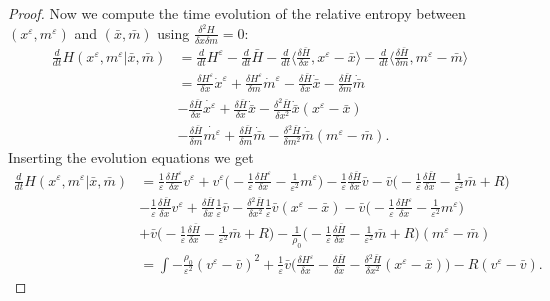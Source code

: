 \documentclass[10pt, letterpaper]{article}
\def\eps{\varepsilon}
\theoremstyle{definition}
\theoremstyle{remark}
\begin{document}
\begin{proof}
Now we compute the time evolution of the relative entropy between $(x^\eps,m^\eps)$ and $(\bar x, \bar m)$ using $\frac{\delta^2 H}{\delta x \delta m}=0$:
\begin{align*}
 \frac{d}{dt} H(x^\eps, m^\eps| \bar{x}, \bar{m }) &= \frac{d}{dt} H^\eps - \frac{d}{dt} \bar{H} - \frac{d}{dt} \langle \frac{\delta \bar{H}}{\delta x}, x^\eps -\bar{x}\rangle 
 - \frac{d}{dt} \langle \frac{\delta \bar{H}}{\delta m}, m^\eps-\bar{ m }\rangle \\
 &= \frac{\delta {H}^\eps}{\delta x}\dot x^\eps + \frac{\delta H^\eps}{\delta m}\dot m^\eps- \frac{\delta \bar{H}}{\delta x}\dot{\bar{x}} - \frac{\delta \bar{H}}{\delta {m}}\dot{\bar{ {m}}} \\
 &- \frac{\delta \bar{H}}{\delta x}\dot{{x}^\eps} + \frac{\delta \bar{H}}{\delta x}\dot{\bar{x}} - \frac{\delta^2 \bar{H}}{\delta x^2}\dot{\bar{x}} (x^\eps-\bar{x})  \\
 &-\frac{\delta \bar{H}}{\delta {m}}\dot{{ {m}^\eps}} + \frac{\delta \bar{H}}{\delta {m}}\dot{\bar{ {m}}}
 - \frac{\delta^2 \bar{H}}{\delta {m}^2}\dot{\bar{ {m}}} ( {m}^\eps-\bar{ {m}}).
 \end{align*}
 Inserting the evolution equations we get
 \begin{align*}
 \frac{d}{dt} H(x^\eps, m^\eps| \bar{x}, \bar{m })  
 &=\frac{1}{\eps}\frac{\delta {H}^\eps}{\delta x} v^\eps + v^\eps \big( -\frac{1}{\eps}\frac{\delta H^\eps}{\delta x} - \frac{1}{\eps^2} m^\eps\big) 
 -\frac{1}{\eps} \frac{\delta \bar{H}}{\delta x}\bar v - \bar v \big( -\frac{1}{\eps}\frac{\delta \bar H}{\delta x} - \frac{1}{\eps^2} \bar m + R\big) \\
 &- \frac{1}{\eps}\frac{\delta \bar{H}}{\delta x}v^\eps + \frac{\delta \bar{H}}{\delta x}\frac{1}{\eps} \bar v - \frac{\delta^2 \bar{H}}{\delta x^2}\frac{1}{\eps} \bar v (x^\eps-\bar{x}) 
 -\bar v\big( -\frac{1}{\eps}\frac{\delta H^\eps}{\delta x} - \frac{1}{\eps^2} m^\eps\big)\\
 &  + \bar v\big( -\frac{1}{\eps}\frac{\delta \bar H}{\delta x} - \frac{1}{\eps^2} \bar m + R\big)
 - \frac{1}{\rho_0}\big( -\frac{1}{\eps}\frac{\delta \bar H}{\delta x} - \frac{1}{\eps^2} \bar m + R\big)( {m}^\eps-\bar{ {m}})\\
 &= \int - \frac{\rho_0}{\eps^2} (v^\eps - \bar v)^2
+ \frac{1}{\eps} \bar v\big( \frac{\delta H^\eps}{\delta x}  - \frac{\delta  \bar H}{\delta x}- \frac{\delta^2 \bar{H}}{\delta x^2} (x^\eps-\bar{x})  \big)  
- R( {v}^\eps-\bar{ {v}}) .
\end{align*}


\end{proof}
\end{document}
